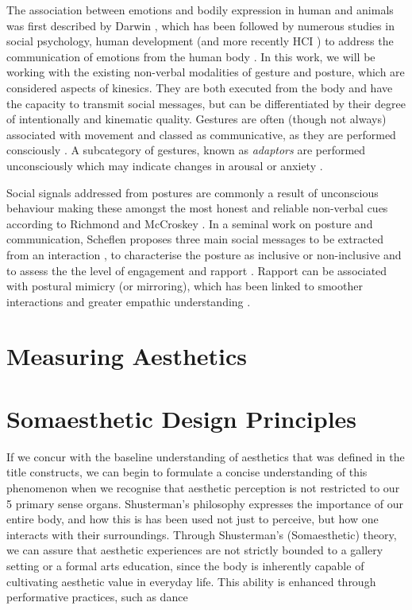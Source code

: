 The association between emotions and bodily expression in human and animals was first described by Darwin \cite{darwin_expression_2013}, which has been followed by numerous studies in social psychology, human development (and more recently HCI \cite{alaoui_movement_2012, gillies_creating_2018, fdili_alaoui_strategies_2015}) to address the communication of emotions from the human body \cite{gunes_lab_2008}. In this work, we will be working with the existing non-verbal modalities of gesture and posture, which are considered aspects of kinesics. They are both executed from the body and have the capacity to transmit social messages, but can be differentiated by their degree of intentionally and kinematic quality. Gestures are often (though not always) associated with movement and classed as communicative, as they are performed consciously \cite{vinciarelli_towards_2011}. A subcategory of gestures, known as \textit{adaptors} are performed unconsciously which may indicate changes in arousal or anxiety \cite{hans_kinesics_2015, neff_dont_2011}. 

Social signals addressed from postures are commonly a result of unconscious behaviour making these amongst the most honest and reliable non-verbal cues according to Richmond and McCroskey \cite{richmond_nonverbal_2011}. In a seminal work on posture and communication, Scheflen proposes three main social messages to be extracted from an interaction \cite{scheflen_significance_1964}, to characterise the posture as inclusive or non-inclusive and to assess the the level of engagement and rapport \cite{vinciarelli_social_2009}. Rapport can be associated with postural mimicry (or mirroring), which has been linked to smoother interactions and greater empathic understanding \cite{chartrand_chameleon_1999}. 

\section {Measuring Aesthetics}



\section{Somaesthetic Design Principles}

If we concur with the baseline understanding of aesthetics that was defined in the title constructs, we can begin to formulate a concise understanding of this phenomenon when we recognise that aesthetic perception is not restricted to our 5 primary sense organs. Shusterman's philosophy expresses the importance of our entire body, and how this is has been used not just to perceive, but how one interacts with their surroundings. Through Shusterman’s (Somaesthetic) theory, we can assure that aesthetic experiences are not strictly bounded to a gallery setting or a formal arts education, since the body is inherently capable of cultivating aesthetic value in everyday life. This ability is enhanced through performative practices, such as dance \cite{eric_c_mullis_performative_2006}

